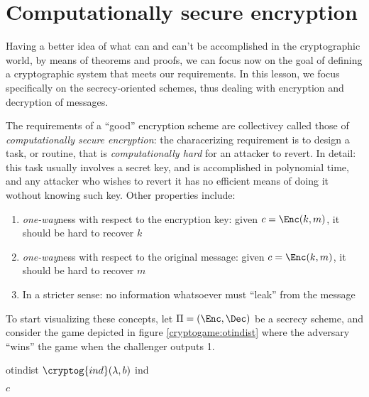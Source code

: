 
\section{Computationally secure encryption}

Having a better idea of what can and can't be accomplished in the cryptographic world, by means of theorems and proofs, we can focus now on the goal of defining a cryptographic system that meets our requirements. In this lesson, we focus specifically on the secrecy-oriented schemes, thus dealing with encryption and decryption of messages.

The requirements of a ``good'' encryption scheme are collectivey called those of \emph{computationally secure encryption}: the characerizing requirement is to design a task, or routine, that is \emph{computationally hard} for an attacker to revert.
In detail: this task usually involves a secret key\footnotemark, and is accomplished in polynomial time, and any attacker who wishes to revert it has no efficient means of doing it wothout knowing such key. Other properties include:


\begin{enumerate}
    \item \label{prop:owk} \emph{one-way}ness with respect to the encryption key: given $c = \Enc(k, m)$, it should be hard to recover $k$
    \item \label{prop:owm} \emph{one-way}ness with respect to the original message: given $c = \Enc(k, m)$, it should be hard to recover $m$
    \item \label{prop:nol} In a stricter sense: no information whatsoever must ``leak'' from the message
\end{enumerate}

To start visualizing these concepts, let $\Pi = (\Enc, \Dec)$ be a secrecy scheme, and consider the game depicted in figure \ref{cryptogame:otindist}  where the adversary ``wins'' the game when the challenger outputs 1.

\begin{cryptogame}
    {otindist}
    {$\cryptog{ind}(\lambda, b)$}
    {ind}


    {$c$}{}

    \cseqdelay

    
\end{cryptogame}

